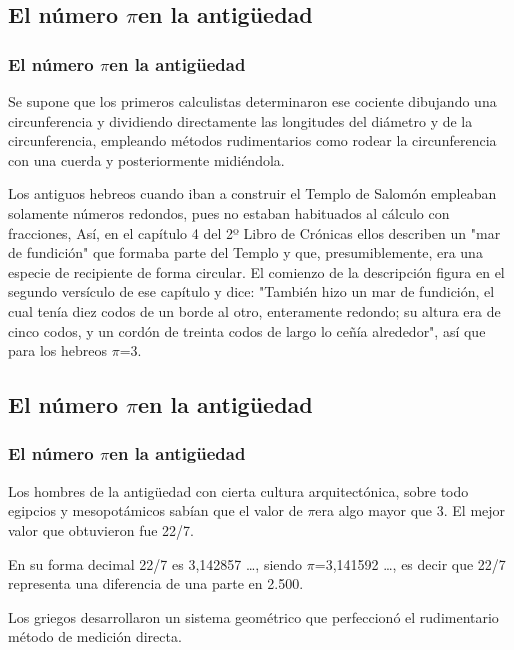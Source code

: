 \documentclass{beamer}
\newcommand{\PI}{{$\pi$}}
\begin{document}
\subsection{El número \PI en la antigüedad}
\begin{frame}
\frametitle{El número \PI en la antigüedad}

Se supone que los primeros calculistas determinaron ese cociente dibujando una circunferencia y dividiendo directamente las longitudes del diámetro y de la circunferencia, empleando métodos rudimentarios como rodear la circunferencia con una cuerda y posteriormente midiéndola.

Los antiguos hebreos cuando iban a construir el Templo de Salomón empleaban solamente números redondos, pues no estaban habituados al cálculo con fracciones, Así, en el capítulo 4 del 2º Libro de Crónicas ellos describen un "mar de fundición" que formaba parte del Templo y que, presumiblemente, era una especie de recipiente de forma circular. El comienzo de la descripción figura en el segundo versículo de ese capítulo y dice: "También hizo un mar de fundición, el cual tenía diez codos de un borde al otro, enteramente redondo; su altura era de cinco codos, y un cordón de treinta codos de largo lo ceñía alrededor", así que para los hebreos \PI=3.
\end{frame}

\subsection{El número \PI en la antigüedad}
\begin{frame}
\frametitle{El número \PI en la antigüedad}
Los hombres de la antigüedad con cierta cultura arquitectónica, sobre todo egipcios y mesopotámicos sabían que el valor de \PI era algo mayor que 3. El mejor valor que obtuvieron fue 22/7.

En su forma decimal 22/7 es 3,142857 \dots, siendo \PI=3,141592 \dots, es decir que 22/7 representa una diferencia de una parte en 2.500.

Los griegos desarrollaron un sistema geométrico que perfeccionó el rudimentario método de medición directa.\cite {link2}
\end {frame}
\end{document}
